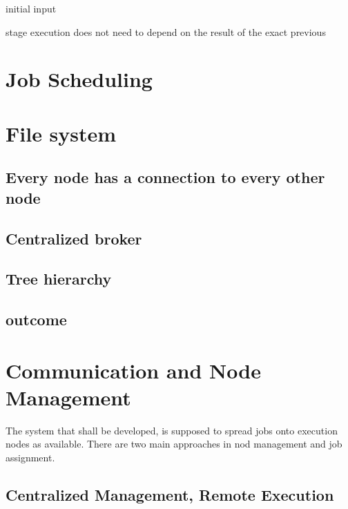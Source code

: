 


initial input

stage execution does not need to depend on the result of the exact previous



\section{Job Scheduling}



\section{File system}


\subsection{Every node has a connection to every other node}

\subsection{Centralized broker}

\subsection{Tree hierarchy}

\subsection{outcome}




\section{Communication and Node Management}

The system that shall be developed, is supposed to spread jobs onto execution nodes as available.
There are two main approaches in nod management and job assignment.



\subsection{Centralized Management, Remote Execution}

